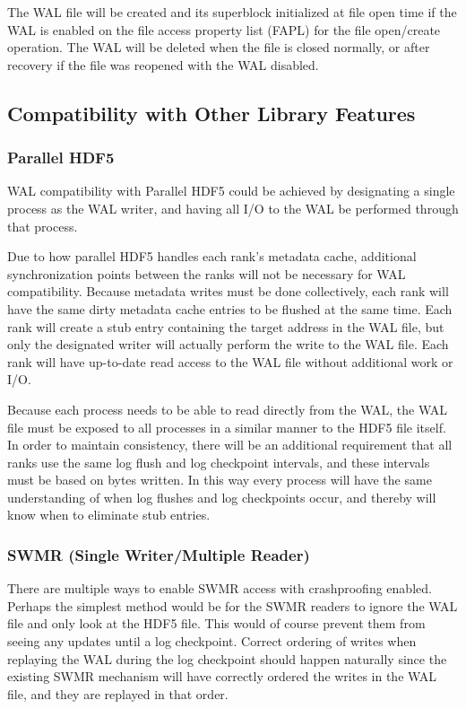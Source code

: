 The WAL file will be created and its superblock initialized at file open time if the WAL is enabled on the file access property list (FAPL) for the file open/create operation. The WAL will be deleted when the file is closed normally, or after recovery if the file was reopened with the WAL disabled.

\subsection{Compatibility with Other Library Features}

\subsubsection{Parallel HDF5}

WAL compatibility with Parallel HDF5 could be achieved by designating a single process as the WAL writer, and having all I/O to the WAL be performed through that process. 

Due to how parallel HDF5 handles each rank's metadata cache, additional synchronization points between the ranks will not be necessary for WAL compatibility. Because metadata writes must be done collectively, each rank will have the same dirty metadata cache entries to be flushed at the same time. Each rank will create a stub entry containing the target address in the WAL file, but only the designated writer will actually perform the write to the WAL file. Each rank will have up-to-date read access to the WAL file without additional work or I/O.

Because each process needs to be able to read directly from the WAL, the WAL file must be exposed to all processes in a similar manner to the HDF5 file itself. In order to maintain consistency, there will be an additional requirement that all ranks use the same log flush and log checkpoint intervals, and these intervals must be based on bytes written. In this way every process will have the same understanding of when log flushes and log checkpoints occur, and thereby will know when to eliminate stub entries.

\subsubsection{SWMR (Single Writer/Multiple Reader)}

There are multiple ways to enable SWMR access with crashproofing enabled. Perhaps the simplest method would be for the SWMR readers to ignore the WAL file and only look at the HDF5 file. This would of course prevent them from seeing any updates until a log checkpoint. Correct ordering of writes when replaying the WAL during the log checkpoint should happen naturally since the existing SWMR mechanism will have correctly ordered the writes in the WAL file, and they are replayed in that order.

